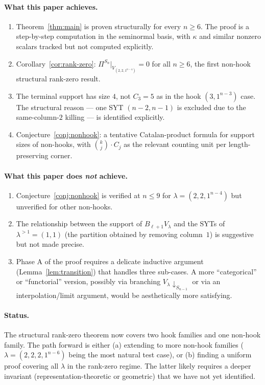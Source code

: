 \documentclass[11pt]{article}
\theoremstyle{definition}
\begin{document}
\paragraph{What this paper achieves.}
\begin{enumerate}[leftmargin=2em,topsep=0.3em,itemsep=0.2em]
\item Theorem~\ref{thm:main} is proven structurally for every
$n \ge 6$.  The proof is a step-by-step computation in the seminormal
basis, with $\kappa$ and similar nonzero scalars tracked but not
computed explicitly.
\item Corollary~\ref{cor:rank-zero}: $\Pi^{S_n}|_{V_{(2,2,1^{n-4})}}
= 0$ for all $n \ge 6$, the first non-hook structural rank-zero
result.
\item The terminal support has size $4$, not $C_3 = 5$ as in the
hook $(3,1^{n-3})$ case.  The structural reason --- one SYT
$(n-2,n-1)$ is excluded due to the same-column-$2$ killing --- is
identified explicitly.
\item Conjecture~\ref{conj:nonhook}: a tentative Catalan-product
formula for support sizes of non-hooks, with $\binom{k}{j}\cdot C_j$
as the relevant counting unit per length-preserving corner.
\end{enumerate}

\paragraph{What this paper does \emph{not} achieve.}
\begin{enumerate}[leftmargin=2em,topsep=0.3em,itemsep=0.2em]
\item Conjecture~\ref{conj:nonhook} is verified at $n \le 9$ for
$\lambda = (2,2,1^{n-4})$ but unverified for other non-hooks.
\item The relationship between the support of $B_{\ell+1} V_\lambda$
and the SYTs of $\lambda^{>1} = (1, 1)$ (the partition obtained by
removing column~$1$) is suggestive but not made precise.
\item Phase A of the proof requires a delicate inductive argument
(Lemma~\ref{lem:transition}) that handles three sub-cases.  A more
``categorical'' or ``functorial'' version, possibly via branching
$V_\lambda \downarrow_{S_{n-1}}$ or via an interpolation/limit
argument, would be aesthetically more satisfying.
\end{enumerate}

\paragraph{Status.}  The structural rank-zero theorem now covers two
hook families and one non-hook family.  The path forward is either
(a) extending to more non-hook families
($\lambda = (2,2,2,1^{n-6})$ being the most natural test case), or
(b) finding a uniform proof covering all $\lambda$ in the rank-zero
regime.  The latter likely requires a deeper invariant
(representation-theoretic or geometric) that we have not yet
identified.
\end{document}
